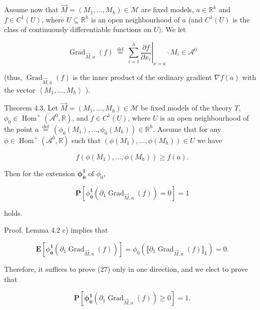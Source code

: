 \documentclass[10pt]{article}
\begin{document}
Assume now that $\vec{M}=\left(M_{1}, \ldots, M_{h}\right) \in \mathcal{M}$ are fixed models, $a \in \mathbb{R}^{h}$ and $f \in C^{1}(U)$, where $U \subseteq \mathbb{R}^{h}$ is an open neighbourhood of $a$ (and $C^{1}(U)$ is the class of continuously differentiable functions on $U)$. We let

$$
\left.\operatorname{Grad}_{\vec{M}, a}(f) \stackrel{\text { def }}{=} \sum_{i=1}^{h} \frac{\partial f}{\partial x_{i}}\right|_{x=a} \cdot M_{i} \in \mathcal{A}^{0}
$$

(thus, $\operatorname{Grad}_{\vec{M}, a}(f)$ is the inner product of the ordinary gradient $\nabla f(a)$ with the vector $\left\langle M_{1}, \ldots, M_{h}\right\rangle$ ).

Theorem 4.3. Let $\vec{M}=\left(M_{1}, \ldots, M_{h}\right) \in \mathcal{M}$ be fixed models of the theory $T$, $\phi_{0} \in \operatorname{Hom}^{+}\left(\mathcal{A}^{0}, \mathbb{R}\right)$, and $f \in C^{1}(U)$, where $U$ is an open neighbourhood of the point $a \stackrel{\text { def }}{=}\left(\phi_{0}\left(M_{1}\right), \ldots, \phi_{0}\left(M_{h}\right)\right) \in \mathbb{R}^{h}$. Assume that for any $\phi \in \operatorname{Hom}^{+}\left(\mathcal{A}^{0}, \mathbb{R}\right)$ such that $\left(\phi\left(M_{1}\right), \ldots, \phi\left(M_{h}\right)\right) \in U$ we have

$$
f\left(\phi\left(M_{1}\right), \ldots, \phi\left(M_{h}\right)\right) \geq f(a) .
$$

Then for the extension $\boldsymbol{\phi}_{\mathbf{0}}^{\mathbf{1}}$ of $\phi_{0}$,


\begin{equation*}
\mathbf{P}\left[\phi_{\mathbf{0}}^{\mathbf{1}}\left(\partial_{1} \operatorname{Grad}_{\vec{M}, a}(f)\right)=0\right]=1 \tag{27}
\end{equation*}


holds.

Proof. Lemma 4.2 c) implies that

$$
\mathbf{E}\left[\phi_{\mathbf{0}}^{\mathbf{1}}\left(\partial_{1} \operatorname{Grad}_{\vec{M}, a}(f)\right)\right]=\phi_{0}\left(\llbracket \partial_{1} \operatorname{Grad}_{\vec{M}, a}(f) \rrbracket_{1}\right)=0 .
$$

Therefore, it suffices to prove (27) only in one direction, and we elect to prove that


\begin{equation*}
\mathbf{P}\left[\boldsymbol{\phi}_{\mathbf{0}}^{\mathbf{1}}\left(\partial_{1} \operatorname{Grad}_{\vec{M}, a}(f)\right) \geq 0\right]=1 . \tag{28}
\end{equation*}
\end{document}
